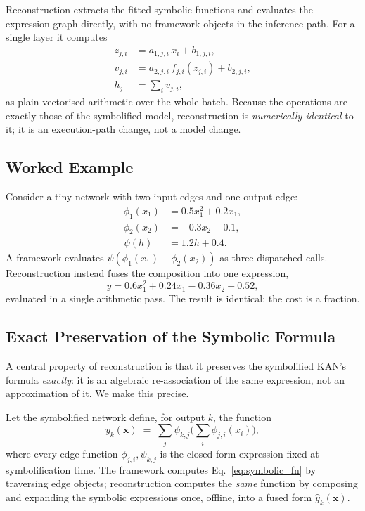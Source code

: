 \documentclass[conference]{IEEEtran}
\begin{document}
Reconstruction extracts the fitted symbolic functions and evaluates the
expression graph directly, with no framework objects in the inference path.
For a single layer it computes
\begin{align}
z_{j,i} &= a_{1,j,i}\,x_i + b_{1,j,i},\\
v_{j,i} &= a_{2,j,i}\, f_{j,i}(z_{j,i}) + b_{2,j,i},\\
h_j &= \sum_i v_{j,i},
\end{align}
as plain vectorised arithmetic over the whole batch. Because the operations are
exactly those of the symbolified model, reconstruction is \emph{numerically
identical} to it; it is an execution-path change, not a model change.

\subsection{Worked Example}

Consider a tiny network with two input edges and one output edge:
\begin{align}
\phi_1(x_1) &= 0.5x_1^2 + 0.2x_1,\\
\phi_2(x_2) &= -0.3x_2 + 0.1,\\
\psi(h) &= 1.2h + 0.4.
\end{align}
A framework evaluates $\psi(\phi_1(x_1)+\phi_2(x_2))$ as three dispatched calls.
Reconstruction instead fuses the composition into one expression,
\begin{equation}
y = 0.6x_1^2 + 0.24x_1 - 0.36x_2 + 0.52,
\end{equation}
evaluated in a single arithmetic pass. The result is identical; the cost is a
fraction.

\subsection{Exact Preservation of the Symbolic Formula}
\label{sec:preserve}

A central property of reconstruction is that it preserves the symbolified
KAN's formula \emph{exactly}: it is an algebraic re-association of the same
expression, not an approximation of it. We make this precise.

Let the symbolified network define, for output $k$, the function
\begin{equation}
y_k(\mathbf{x}) \;=\; \sum_{j} \psi_{k,j}\!\Big(\sum_{i} \phi_{j,i}(x_i)\Big),
\label{eq:symbolic_fn}
\end{equation}
where every edge function $\phi_{j,i},\psi_{k,j}$ is the closed-form expression
fixed at symbolification time. The framework computes
Eq.~\eqref{eq:symbolic_fn} by traversing edge objects; reconstruction computes
the \emph{same} function by composing and expanding the symbolic expressions
once, offline, into a fused form $\hat{y}_k(\mathbf{x})$.
\end{document}
